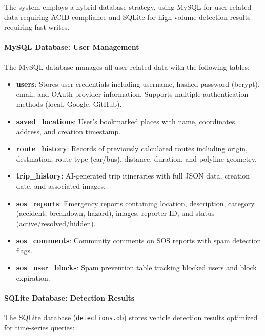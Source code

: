 The system employs a hybrid database strategy, using MySQL for user-related data requiring ACID compliance and SQLite for high-volume detection results requiring fast writes.

\paragraph{MySQL Database: User Management}

The MySQL database manages all user-related data with the following tables:

\begin{itemize}[noitemsep]
    \item \textbf{users}: Stores user credentials including username, hashed password (bcrypt), email, and OAuth provider information. Supports multiple authentication methods (local, Google, GitHub).
    
    \item \textbf{saved\_locations}: User's bookmarked places with name, coordinates, address, and creation timestamp.
    
    \item \textbf{route\_history}: Records of previously calculated routes including origin, destination, route type (car/bus), distance, duration, and polyline geometry.
    
    \item \textbf{trip\_history}: AI-generated trip itineraries with full JSON data, creation date, and associated images.
    
    \item \textbf{sos\_reports}: Emergency reports containing location, description, category (accident, breakdown, hazard), images, reporter ID, and status (active/resolved/hidden).
    
    \item \textbf{sos\_comments}: Community comments on SOS reports with spam detection flags.
    
    \item \textbf{sos\_user\_blocks}: Spam prevention table tracking blocked users and block expiration.
\end{itemize}

\paragraph{SQLite Database: Detection Results}

The SQLite database (\texttt{detections.db}) stores vehicle detection results optimized for time-series queries:

